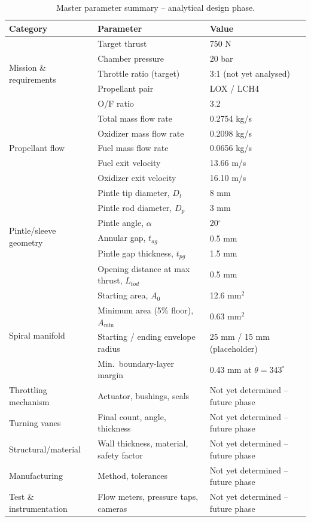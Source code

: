 \documentclass[11pt,a4paper]{article}
\begin{document}
\begin{table}[h]
\centering
\caption{Master parameter summary -- analytical design phase.}
\label{tab:master-params}
\begin{tabular}{@{}p{3.1cm}p{5.6cm}p{5.0cm}@{}}
\toprule
Category & Parameter & Value \\
\midrule
\multirow{5}{*}{\parbox{2.8cm}{Mission \& requirements}}
 & Target thrust & 750 N \\
 & Chamber pressure & 20 bar \\
 & Throttle ratio (target) & 3:1 (not yet analysed) \\
 & Propellant pair & LOX / LCH4 \\
 & O/F ratio & 3.2 \\
\midrule
\multirow{5}{*}{\parbox{2.8cm}{Propellant flow}}
 & Total mass flow rate & 0.2754 kg/s \\
 & Oxidizer mass flow rate & 0.2098 kg/s \\
 & Fuel mass flow rate & 0.0656 kg/s \\
 & Fuel exit velocity & 13.66 m/s \\
 & Oxidizer exit velocity & 16.10 m/s \\
\midrule
\multirow{6}{*}{\parbox{2.8cm}{Pintle/sleeve geometry}}
 & Pintle tip diameter, $D_t$ & 8 mm \\
 & Pintle rod diameter, $D_p$ & 3 mm \\
 & Pintle angle, $\alpha$ & 20$^\circ$ \\
 & Annular gap, $t_{ag}$ & 0.5 mm \\
 & Pintle gap thickness, $t_{pg}$ & 1.5 mm \\
 & Opening distance at max thrust, $L_{tod}$ & 0.5 mm \\
\midrule
\multirow{4}{*}{\parbox{2.8cm}{Spiral manifold}}
 & Starting area, $A_0$ & 12.6 mm$^2$ \\
 & Minimum area (5\% floor), $A_{\min}$ & 0.63 mm$^2$ \\
 & Starting / ending envelope radius & 25 mm / 15 mm (placeholder) \\
 & Min.\ boundary-layer margin & 0.43 mm at $\theta = 343^\circ$ \\
\midrule
Throttling mechanism & Actuator, bushings, seals & Not yet determined -- future phase \\
Turning vanes & Final count, angle, thickness & Not yet determined -- future phase \\
Structural/material & Wall thickness, material, safety factor & Not yet determined -- future phase \\
Manufacturing & Method, tolerances & Not yet determined -- future phase \\
Test \& instrumentation & Flow meters, pressure taps, cameras & Not yet determined -- future phase \\
\bottomrule
\end{tabular}
\end{table}
\end{document}
